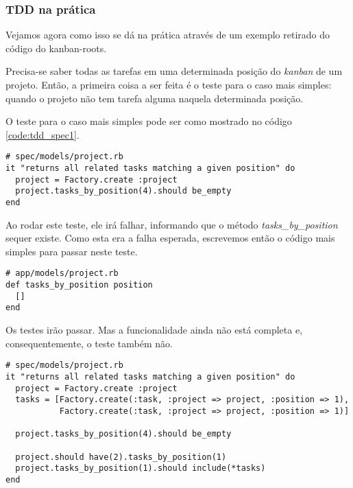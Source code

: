 \subsubsection{TDD na prática}
\label{ssub:tdd_na_pratica}

Vejamos agora como isso se dá na prática através de um exemplo retirado do código do kanban-roots.

Precisa-se saber todas as tarefas em uma determinada posição do \textit{kanban} de um projeto. Então, a primeira coisa a ser feita é o teste para o caso mais simples: quando o projeto não tem tarefa alguma naquela determinada posição.

O teste para o caso mais simples pode ser como mostrado no código \ref{code:tdd_spec1}.

\begin{lstlisting}[caption=Teste para o método Project\#tasks\_by\_position (versão 1),label=code:tdd_spec1]
# spec/models/project.rb
it "returns all related tasks matching a given position" do
  project = Factory.create :project
  project.tasks_by_position(4).should be_empty
end
\end{lstlisting}

Ao rodar este teste, ele irá falhar, informando que o método \textit{tasks\_by\_position} sequer existe. Como esta era a falha esperada, escrevemos então o código mais simples para passar neste teste.

\begin{lstlisting}[caption=Código do método Project\#tasks\_by\_position (versão 1),label=code:tdd_code1]
# app/models/project.rb
def tasks_by_position position
  []
end
\end{lstlisting}

Os testes irão passar. Mas a funcionalidade ainda não está completa e, consequentemente, o teste também não.

\begin{lstlisting}[caption=Teste do método Project\#tasks\_by\_position (versão 2),label=code:tdd_spec2]
# spec/models/project.rb
it "returns all related tasks matching a given position" do
  project = Factory.create :project
  tasks = [Factory.create(:task, :project => project, :position => 1),
           Factory.create(:task, :project => project, :position => 1)]

  project.tasks_by_position(4).should be_empty

  project.should have(2).tasks_by_position(1)
  project.tasks_by_position(1).should include(*tasks)
end
\end{lstlisting}

